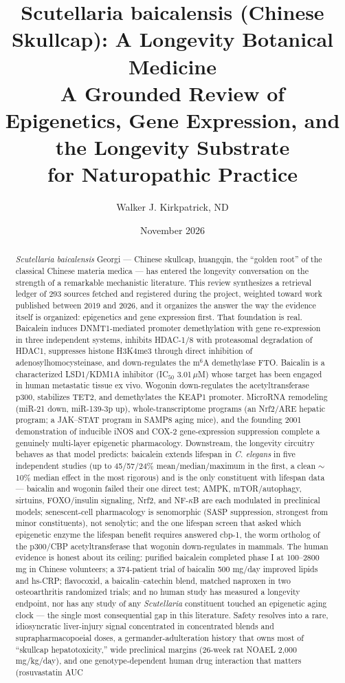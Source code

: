 \documentclass[11pt]{article}
\title{\Large \textbf{Scutellaria baicalensis (Chinese Skullcap): A Longevity Botanical Medicine \\ A Grounded Review of Epigenetics, Gene Expression, and the Longevity Substrate \\ for Naturopathic Practice}}
\author{\normalsize Walker J. Kirkpatrick, ND}
\date{\normalsize November 2026}
\begin{document}
\maketitle

\begin{abstract}
\noindent
\textit{Scutellaria baicalensis} Georgi --- Chinese skullcap, huangqin, the ``golden root'' of the classical Chinese materia medica --- has entered the longevity conversation on the strength of a remarkable mechanistic literature. This review synthesizes a retrieval ledger of 293 sources fetched and registered during the project, weighted toward work published between 2019 and 2026, and it organizes the answer the way the evidence itself is organized: epigenetics and gene expression first. That foundation is real. Baicalein induces DNMT1-mediated promoter demethylation with gene re-expression in three independent systems, inhibits HDAC-1/8 with proteasomal degradation of HDAC1, suppresses histone H3K4me3 through direct inhibition of adenosylhomocysteinase, and down-regulates the m$^6$A demethylase FTO. Baicalin is a characterized LSD1/KDM1A inhibitor (IC$_{50}$ 3.01\,$\mu$M) whose target has been engaged in human metastatic tissue ex vivo. Wogonin down-regulates the acetyltransferase p300, stabilizes TET2, and demethylates the KEAP1 promoter. MicroRNA remodeling (miR-21 down, miR-139-3p up), whole-transcriptome programs (an Nrf2/ARE hepatic program; a JAK--STAT program in SAMP8 aging mice), and the founding 2001 demonstration of inducible iNOS and COX-2 gene-expression suppression complete a genuinely multi-layer epigenetic pharmacology. Downstream, the longevity circuitry behaves as that model predicts: baicalein extends lifespan in \textit{C. elegans} in five independent studies (up to 45/57/24\% mean/median/maximum in the first, a clean $\sim$10\% median effect in the most rigorous) and is the only constituent with lifespan data --- baicalin and wogonin failed their one direct test; AMPK, mTOR/autophagy, sirtuins, FOXO/insulin signaling, Nrf2, and NF-$\kappa$B are each modulated in preclinical models; senescent-cell pharmacology is senomorphic (SASP suppression, strongest from minor constituents), not senolytic; and the one lifespan screen that asked which epigenetic enzyme the lifespan benefit requires answered cbp-1, the worm ortholog of the p300/CBP acetyltransferase that wogonin down-regulates in mammals. The human evidence is honest about its ceiling: purified baicalein completed phase I at 100--2800 mg in Chinese volunteers; a 374-patient trial of baicalin 500 mg/day improved lipids and hs-CRP; flavocoxid, a baicalin--catechin blend, matched naproxen in two osteoarthritis randomized trials; and no human study has measured a longevity endpoint, nor has any study of any \textit{Scutellaria} constituent touched an epigenetic aging clock --- the single most consequential gap in this literature. Safety resolves into a rare, idiosyncratic liver-injury signal concentrated in concentrated blends and suprapharmacopoeial doses, a germander-adulteration history that owns most of ``skullcap hepatotoxicity,'' wide preclinical margins (26-week rat NOAEL 2{,}000 mg/kg/day), and one genotype-dependent human drug interaction that matters (rosuvastatin AUC 
\end{abstract}
\end{document}
